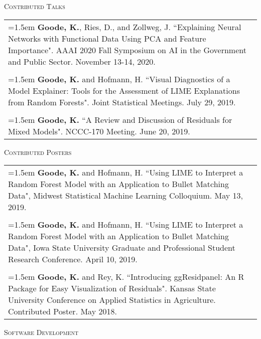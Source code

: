 \documentclass[10pt, oneside]{article}
\begin{document}
\noindent \textsc{Contributed Talks} \hrulefill
\begin{longtable}{p{16.5cm}}
\hangindent=1.5em \textbf{Goode, K.}, Ries, D., and Zollweg, J. ``Explaining Neural Networks with Functional Data Using PCA and Feature Importance". AAAI 2020 Fall Symposium on AI in the Government and Public Sector. November 13-14, 2020.\\
\\
\hangindent=1.5em \textbf{Goode, K.} and Hofmann, H. ``Visual Diagnostics of a Model Explainer: Tools for the Assessment of LIME Explanations from Random Forests". Joint Statistical Meetings. July 29, 2019.\\
\\
\hangindent=1.5em \textbf{Goode, K.} ``A Review and Discussion of Residuals for Mixed Models". NCCC-170 Meeting. June 20, 2019.
\end{longtable}

\noindent \textsc{Contributed Posters} \hrulefill
\begin{longtable}{p{16.5cm}}
\hangindent=1.5em \textbf{Goode, K.} and Hofmann, H. ``Using LIME to Interpret a Random Forest Model with an Application to Bullet Matching Data", Midwest Statistical Machine Learning Colloquium. May 13, 2019.\\
\\ 
\hangindent=1.5em \textbf{Goode, K.} and Hofmann, H. ``Using LIME to Interpret a Random Forest Model with an Application to Bullet Matching Data", Iowa State University Graduate and Professional Student Research Conference. April 10, 2019.\\
\\ 
\hangindent=1.5em \textbf{Goode, K.} and Rey, K. ``Introducing ggResidpanel: An R Package for Easy Visualization of Residuals". Kansas State University Conference on Applied Statistics in Agriculture. Contributed Poster. May 2018.
\end{longtable}

\noindent \textsc{Software Development} \hrulefill
\end{document}
